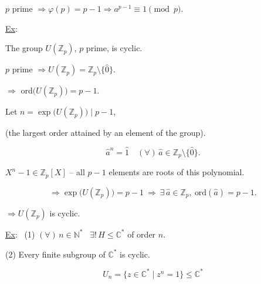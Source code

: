 \noindent $p$ prime $\Rightarrow \varphi(p)=p-1 \Rightarrow a^{p-1}\equiv 1 \pmod p$.

\bigskip
\noindent\underline{Ex}:

\noindent The group $U(\mathbb{Z}_p)$, $p$ prime, is cyclic.

\bigskip
\noindent $p$ prime $\Rightarrow U(\mathbb{Z}_p) = \mathbb{Z}_p\setminus\{\hat 0\}$.

\noindent $\Rightarrow$ ord$\big(U(\mathbb{Z}_p)\big)=p-1$.

\bigskip
\noindent Let $n=\exp\big(U(\mathbb{Z}_p)\big) \mid p-1$,

\noindent \big(the largest order attained by an element of the group\big).

\[
\hat a^n = \hat 1 \quad (\forall)\,\hat a\in\mathbb{Z}_p\setminus\{\hat 0\}.
\]

\noindent $X^n-1\in\mathbb{Z}_p[X]$ -- all $p-1$ elements are roots of this polynomial.

\[
\Rightarrow \exp\big(U(\mathbb{Z}_p)\big) = p-1 \ \Rightarrow \ \exists\,\hat a\in\mathbb{Z}_p, \ \text{ord}(\hat a)=p-1.
\]

\noindent $\Rightarrow U(\mathbb{Z}_p)$ is cyclic.

\bigskip
\noindent\underline{Ex}: \ (1) $(\forall)\,n\in\mathbb{N}^*$ \ $\exists!\,H\leq\mathbb{C}^*$ of order $n$.

\noindent (2) Every finite subgroup of $\mathbb{C}^*$ is cyclic.

\[
U_n = \{z\in\mathbb{C}^* \mid z^n=1\} \leq \mathbb{C}^*
\]
